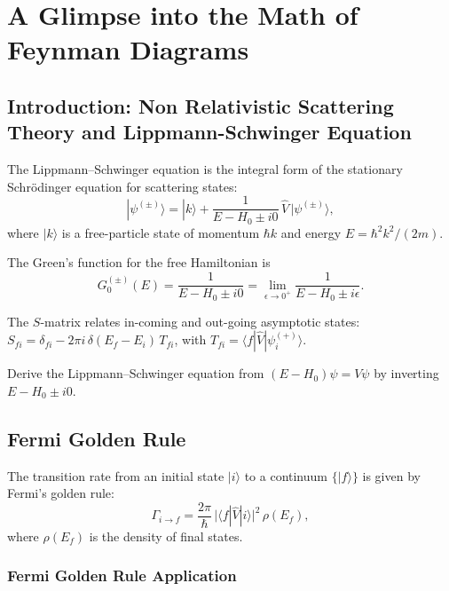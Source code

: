 \chapter{A Glimpse into the Math of Feynman Diagrams}

\section{Introduction: Non Relativistic Scattering Theory and Lippmann-Schwinger Equation}

The Lippmann--Schwinger equation is the integral form of the stationary
Schr\"odinger equation for scattering states:
\begin{equation}
|\psi^{(\pm)}\rangle = |k\rangle
+ \frac{1}{E-H_0\pm i0}\,\hat V\,|\psi^{(\pm)}\rangle,
\label{eq:10.1.1}
\end{equation}
where $|k\rangle$ is a free-particle state of momentum $\hbar k$ and energy
$E=\hbar^2k^2/(2m)$.

The Green's function for the free Hamiltonian is
\begin{equation}
G_0^{(\pm)}(E) = \frac{1}{E-H_0\pm i0}
= \lim_{\epsilon\to0^+}\frac{1}{E-H_0\pm i\epsilon}.
\label{eq:10.1.2}
\end{equation}

The $S$-matrix relates in-coming and out-going asymptotic states:
$S_{fi}=\delta_{fi}-2\pi i\,\delta(E_f-E_i)\,T_{fi}$, with
$T_{fi}=\langle f|\hat V|\psi_i^{(+)}\rangle$.

\begin{exercise}
Derive the Lippmann--Schwinger equation from
$(E-H_0)\psi=V\psi$ by inverting $E-H_0\pm i0$.
\end{exercise}

\section{Fermi Golden Rule}

The transition rate from an initial state $|i\rangle$ to a continuum
$\{|f\rangle\}$ is given by Fermi's golden rule:
\begin{equation}
\Gamma_{i\to f} = \frac{2\pi}{\hbar}\,
\bigl|\langle f|\hat V|i\rangle\bigr|^2\,\rho(E_f),
\label{eq:10.2.1}
\end{equation}
where $\rho(E_f)$ is the density of final states.

\subsection{Fermi Golden Rule Application}

